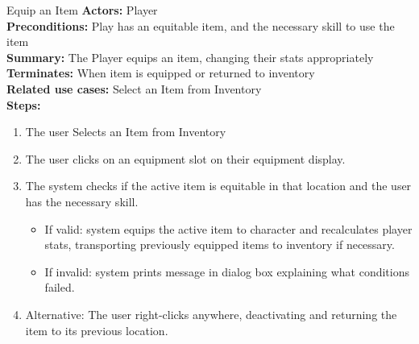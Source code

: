 \documentclass[12pt]{report}
\begin{document}
\begin{subsection}{Equip an Item}
\textbf{Actors:} Player \\
\textbf{Preconditions:} Play has an equitable item, and the necessary skill to use the item \\
\textbf{Summary:} The Player equips an item, changing their stats appropriately \\
\textbf{Terminates:} When item is equipped or returned to inventory \\
\textbf{Related use cases:} Select an Item from Inventory \\
\textbf{Steps:}

\begin{enumerate}
	\item The user Selects an Item from Inventory
	\item The user clicks on an equipment slot on their equipment display.
	\item The system checks if the active item is equitable in that location and the user has the necessary skill.
	\begin{itemize}
		\item If valid: system equips the active item to character and recalculates player stats,
			transporting previously equipped items to inventory if necessary.
		\item If invalid: system prints message in dialog box explaining what conditions failed.
	\end{itemize}
	\item Alternative: The user right-clicks anywhere, deactivating and returning the item to its previous location.
\end{enumerate}
\end{subsection}
\end{document}
